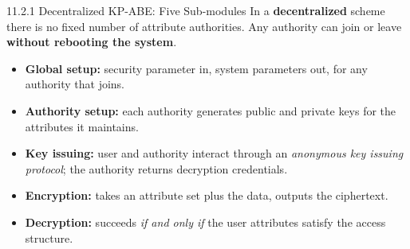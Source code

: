 \documentclass[11pt,aspectratio=169]{beamer}
\newcommand{\kw}[1]{\textbf{\color{accent}#1}}
\begin{document}
\begin{frame}{11.2.1 Decentralized KP-ABE: Five Sub-modules}
  \small
  In a \kw{decentralized} scheme there is no fixed number of attribute
  authorities. Any authority can join or leave \kw{without rebooting the
  system}.
  \vspace{0.9em}

  \begin{center}
  \end{center}
  \vspace{0.7em}

  \begin{itemize}\scriptsize\setlength{\itemsep}{0.32em}
    \item \kw{Global setup:} security parameter in, system parameters out, for
          any authority that joins.
    \item \kw{Authority setup:} each authority generates public and private
          keys for the attributes it maintains.
    \item \kw{Key issuing:} user and authority interact through an
          \emph{anonymous key issuing protocol}; the authority returns
          decryption credentials.
    \item \kw{Encryption:} takes an attribute set plus the data, outputs the
          ciphertext.
    \item \kw{Decryption:} succeeds \emph{if and only if} the user attributes
          satisfy the access structure.
  \end{itemize}
\end{frame}
\end{document}
